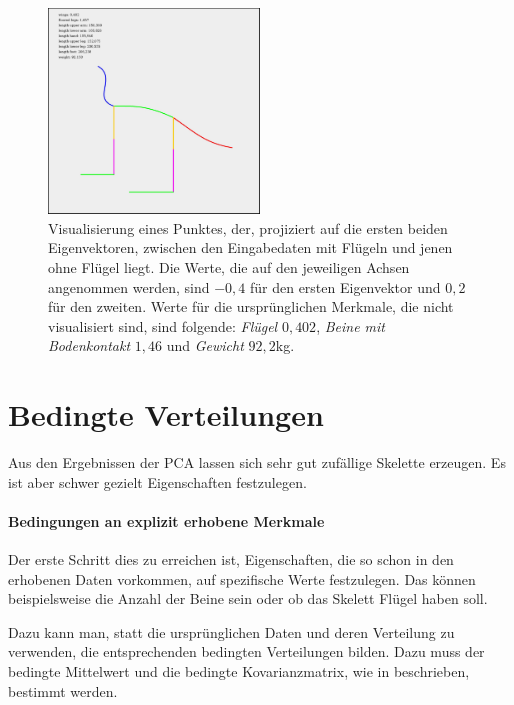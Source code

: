  \begin{figure}
  \centering
  \includegraphics[width=0.5\textwidth]{graphics/betweenClusters.jpg}
  \caption{Visualisierung eines Punktes, der, projiziert auf die ersten beiden Eigenvektoren, zwischen den Eingabedaten mit Flügeln und jenen ohne Flügel liegt. Die Werte, die auf den jeweiligen Achsen angenommen werden, sind $-0{,}4$ für den ersten Eigenvektor und $0{,}2$ für den zweiten. Werte für die ursprünglichen Merkmale, die nicht visualisiert sind, sind folgende: \emph{Flügel} $0{,}402$, \emph{Beine mit Bodenkontakt} $1{,}46$ und \emph{Gewicht} $92{,}2$kg.}
  \label{between_clusters}
 \end{figure}

 
 \clearpage
 \section{Bedingte Verteilungen}
 \label{pca_conditions}
 
 Aus den Ergebnissen der PCA lassen sich sehr gut zufällige Skelette erzeugen. Es ist aber schwer gezielt Eigenschaften festzulegen.
 
 \paragraph{Bedingungen an explizit erhobene Merkmale}
 Der erste Schritt dies zu erreichen ist, Eigenschaften, die so schon in den erhobenen Daten vorkommen, auf spezifische Werte festzulegen. Das können beispielsweise die Anzahl der Beine sein oder ob das Skelett Flügel haben soll.
 
 Dazu kann man, statt die ursprünglichen Daten und deren Verteilung zu verwenden, die entsprechenden bedingten Verteilungen bilden. Dazu muss der bedingte Mittelwert und die bedingte Kovarianzmatrix, wie in \cite[S.\ $116$ f.]{conditionalDistribution} beschrieben, bestimmt werden.
 
